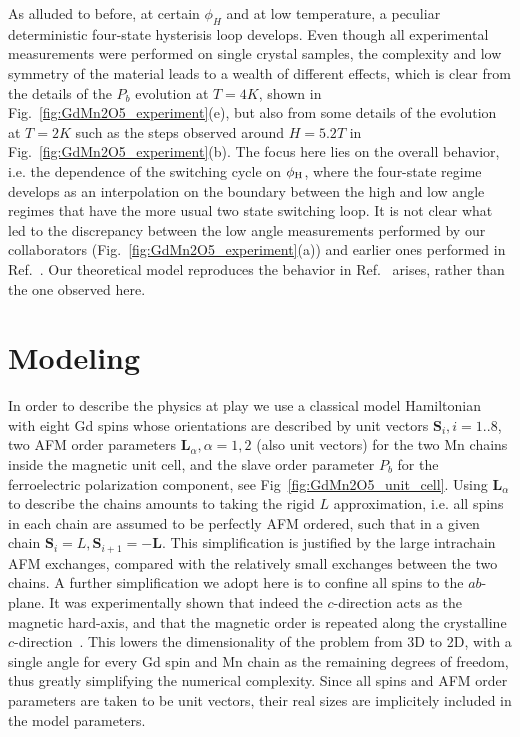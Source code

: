 As alluded to before, at certain $\phi_H$ and at low temperature, a peculiar deterministic four-state hysterisis loop develops.
Even though all experimental measurements were performed on single crystal samples, the complexity and low symmetry of the material leads to a wealth of different effects, which is clear from the details of the $P_b$ evolution at $T=4K$, shown in Fig.~\ref{fig:GdMn2O5_experiment}(e), but also from some details of the evolution at $T=2K$ such as the steps observed around $H=5.2T$ in Fig.~\ref{fig:GdMn2O5_experiment}(b).
The focus here lies on the overall behavior, i.e. the dependence of the switching cycle on $\phi_{\rm H}$, where the four-state regime develops as an interpolation on the boundary between the high and low angle regimes that have the more usual two state switching loop.
It is not clear what led to the discrepancy between the low angle measurements performed by our collaborators (Fig.~\ref{fig:GdMn2O5_experiment}(a)) and earlier ones performed in Ref.~\cite{Lee13}.
Our theoretical model reproduces the behavior in Ref.~\cite{Lee13} arises, rather than the one observed here.

\section{Modeling}
In order to describe the physics at play we use a classical model Hamiltonian with eight Gd spins whose orientations are described by unit vectors $\mathbf{S}_i, i=1..8$, two AFM order parameters $\mathbf{L}_\alpha, \alpha=1,2$ (also unit vectors) for the two Mn chains inside the magnetic unit cell, and the slave order parameter $P_b$ for the ferroelectric polarization component, see Fig~\ref{fig:GdMn2O5_unit_cell}.
Using $\mathbf{L}_\alpha$ to describe the chains amounts to taking the rigid $L$ approximation, i.e. all spins in each chain are assumed to be perfectly AFM ordered, such that in a given chain $\mathbf{S}_i = L, \mathbf{S}_{i+1} = - \mathbf{L}$.
This simplification is justified by the large intrachain AFM exchanges, compared with the relatively small exchanges between the two chains.
A further simplification we adopt here is to confine all spins to the $ab$-plane. It was experimentally shown that indeed the $c$-direction acts as the magnetic hard-axis, and that the magnetic order is repeated along the crystalline $c$-direction~\cite{Lee13}.
This lowers the dimensionality of the problem from 3D to 2D, with a single angle for every Gd spin and Mn chain as the remaining degrees of freedom, thus greatly simplifying the numerical complexity.
Since all spins and AFM order parameters are taken to be unit vectors, their real sizes are implicitely included in the model parameters.

